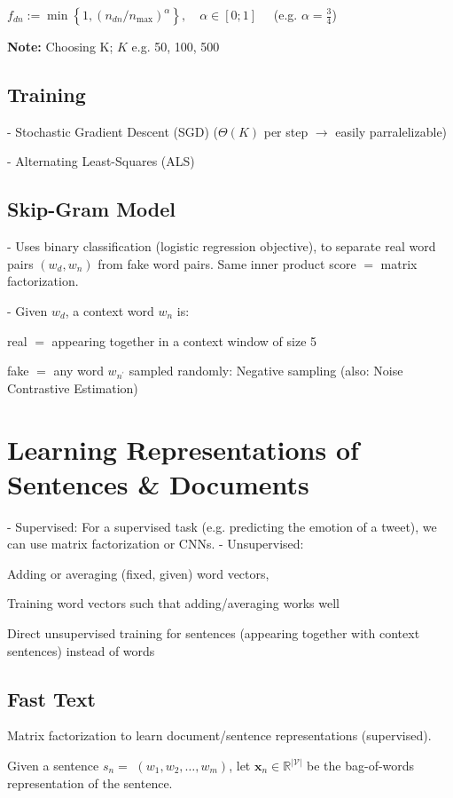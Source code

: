 $f_{d n}:=\min \left\{1,\left(n_{d n} / n_{\max }\right)^{\alpha}\right\}, \quad \alpha \in[0 ; 1] \quad$ (e.g. $\alpha=\frac{3}{4}$)

\textbf{Note:} Choosing K; $K$ e.g. 50, 100, 500

\subsection*{Training}
- Stochastic Gradient Descent (SGD) ($\Theta(K)$ per step $\rightarrow$ easily parralelizable)

- Alternating Least-Squares (ALS)

\subsection*{Skip-Gram Model}
- Uses binary classification (logistic regression objective), to separate real word pairs $\left(w_{d}, w_{n}\right)$ from fake word pairs. Same inner product score $=$ matrix factorization.

- Given $w_{d}$, a context word $w_{n}$ is:

real $=$ appearing together in a context window of size 5

fake $=$ any word $w_{n^{\prime}}$ sampled randomly: Negative sampling (also: Noise Contrastive Estimation)

\section*{Learning Representations of Sentences \& Documents}
- Supervised: For a supervised task (e.g. predicting the emotion of a tweet), we can use matrix factorization or CNNs.
- Unsupervised: 

Adding or averaging (fixed, given) word vectors, 

Training word vectors such that adding/averaging works well

Direct unsupervised training for sentences (appearing together with context sentences) instead of words

\subsection*{Fast Text}
Matrix factorization to learn document/sentence representations (supervised).

Given a sentence $s_{n}=$ $\left(w_{1}, w_{2}, \ldots, w_{m}\right)$, let $\mathbf{x}_{n} \in \mathbb{R}^{|\mathcal{V}|}$ be the bag-of-words representation of the sentence.

